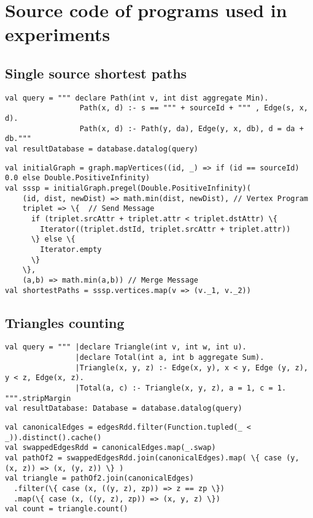 \chapter{Source code of programs used in experiments}\label{appendixa}

\section{Single source shortest paths}
\begin{Verbatim}[label=Shortest paths - SparkDatalog]
val query = """ declare Path(int v, int dist aggregate Min).
                 Path(x, d) :- s == """ + sourceId + """ , Edge(s, x, d).
                 Path(x, d) :- Path(y, da), Edge(y, x, db), d = da + db."""
val resultDatabase = database.datalog(query)
\end{Verbatim}

\vspace{0cm}

\begin{Verbatim}[label=Shortest paths - Spark]
val initialGraph = graph.mapVertices((id, _) => if (id == sourceId) 0.0 else Double.PositiveInfinity)
val sssp = initialGraph.pregel(Double.PositiveInfinity)(
    (id, dist, newDist) => math.min(dist, newDist), // Vertex Program
    triplet => \{  // Send Message
      if (triplet.srcAttr + triplet.attr < triplet.dstAttr) \{
        Iterator((triplet.dstId, triplet.srcAttr + triplet.attr))
      \} else \{
        Iterator.empty
      \}
    \},
    (a,b) => math.min(a,b)) // Merge Message
val shortestPaths = sssp.vertices.map(v => (v._1, v._2))
\end{Verbatim}


\section{Triangles counting}
\begin{Verbatim}[label=Triangles counting - SparkDatalog]
val query = """ |declare Triangle(int v, int w, int u).
                |declare Total(int a, int b aggregate Sum).
                |Triangle(x, y, z) :- Edge(x, y), x < y, Edge (y, z), y < z, Edge(x, z).
                |Total(a, c) :- Triangle(x, y, z), a = 1, c = 1. """.stripMargin
val resultDatabase: Database = database.datalog(query)
\end{Verbatim}

\vspace{0cm}

\begin{Verbatim}[label=Triangles counting - Spark]
val canonicalEdges = edgesRdd.filter(Function.tupled(_ < _)).distinct().cache()
val swappedEdgesRdd = canonicalEdges.map(_.swap)
val pathOf2 = swappedEdgesRdd.join(canonicalEdges).map( \{ case (y, (x, z)) => (x, (y, z)) \} )
val triangle = pathOf2.join(canonicalEdges)
  .filter(\{ case (x, ((y, z), zp)) => z == zp \})
  .map(\{ case (x, ((y, z), zp)) => (x, y, z) \})
val count = triangle.count()
\end{Verbatim}


